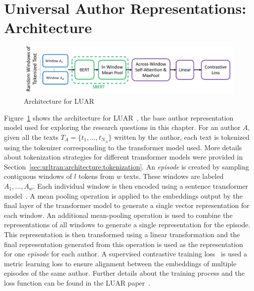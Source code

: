 \section{Universal Author Representations: Architecture}
\label{chp:stylometry_extensions:architecture}

\begin{figure}
    \centering
    \includegraphics[width=\linewidth]{stylometryExtensions/figures/LUAR.pdf}
    \caption{Architecture for LUAR~\citep{riverastao2021learning}}
    \label{fig:stylometry_extensions:followingTrail:LUAR}
\end{figure}

Figure~\ref{fig:stylometry_extensions:followingTrail:LUAR} shows the architecture for LUAR~\citep{riverastao2021learning}, the base author representation model used for exploring the research questions in this chapter. 
For an author $A$, given all the texts $T_A = \{t_1, \dots, t_{N_A}\}$ written by the author, each text is tokenized using the tokenizer corresponding to the transformer model used.
More details about tokenization strategies for different transformer models were provided in Section~\ref{sec:urltran:architecture:tokenization}.
An \textit{episode} is created by sampling contiguous windows of $l$ tokens from $w$ texts.
These windows are labeled $A_1, \dots, A_w$.
Each individual window is then encoded using a sentence transformer model~\citep{reimers2019sentencebert}.
A mean pooling operation is applied to the embeddings output by the final layer of the transformer model to generate a single vector representation for each window.
An additional mean-pooling operation is used to combine the representations of all windows to generate a single representation for the episode.
This representation is then transformed using a linear transformation and the final representation generated from this operation is used as the representation for one \emph{episode} for each author.
A supervised contrastive training loss~\cite{khosla2020supervised} is used a metric learning loss to ensure alignment between the embeddings of multiple episodes of the same author.
Further details about the training process and the loss function can be found in the LUAR paper~\citep{riverastao2021learning}.